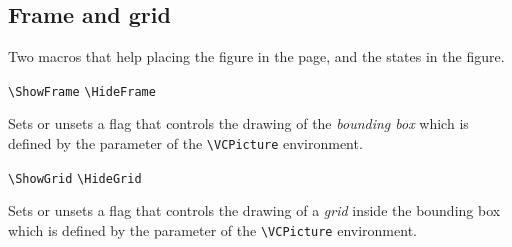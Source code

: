 \documentclass[11pt,twoside]{article}
\newlength{\ColoText}%
\newlength{\ColoFigu}%
\newlength{\parindenttemp} %
\newcommand{\noi}{\noindent}
\newcommand{\ee}{\text{\qquad}}               %
\newlength{\jsIndent}%
\begin{document}
\subsection{Frame and grid}\label{subsec.ffra}

Two macros that help placing the figure in the page, and the states in 
the figure.  

\noi 
\hspace*{-\jsIndent}
\begin{minipage}[t]{\ColoText}
        \par\vspace*{0mm}%
        \footnotesize
\verb+\ShowFrame+ \ee \verb+\HideFrame+ \ee
\end{minipage}%
\hspace*{1.2em}%
\begin{minipage}[t]{\ColoFigu}%
\par\vspace*{0mm}%
Sets or unsets a flag that controls the drawing of the \emph{bounding box} which is 
defined by the parameter of the \verb+\VCPicture+ environment.
\end{minipage}%

\medskip
\noi 
\hspace*{-\jsIndent}
\begin{minipage}[t]{\ColoText}
        \par\vspace*{0mm}%
        \footnotesize
\verb+\ShowGrid+ \ee \verb+\HideGrid+ \ee 
   \end{minipage}%
\hspace*{1.2em}%
\begin{minipage}[t]{\ColoFigu}%
\par\vspace*{0mm}%
Sets or unsets a flag that controls the drawing of a \emph{grid} inside the 
bounding box which is  
defined by the parameter of the \verb+\VCPicture+ environment.
\end{minipage}%
\end{document}
